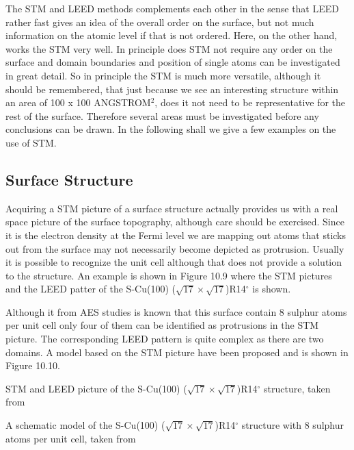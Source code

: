 The STM and LEED methods  complements each other in the sense that LEED rather fast gives an idea of the overall order on the surface, but not much information on the atomic level if that is not ordered. Here, on the other hand,  works the  STM very well. In principle  does STM  not require any order on the surface and domain boundaries and position of single atoms can be investigated in great detail. So in principle the STM is much more versatile, although it should be remembered, that just because we see an interesting structure within an area of 100 x 100 ANGSTROM$^2$, does it not need to be representative for the rest of the surface. Therefore several areas must  be investigated before any conclusions can be drawn. In the following shall we give a few  examples on the use of STM.

\subsection{Surface Structure}
Acquiring a STM picture of a surface structure actually provides us with a real space picture of the surface topography, although care should be exercised. Since  it is the electron density at the Fermi level we are mapping out atoms that sticks out from the surface may  not necessarily become depicted as protrusion. Usually it is possible to recognize the unit cell although that does not provide a solution to the structure. An example is shown in Figure 10.9 where the STM pictures and the LEED patter of the S-Cu(100) ($\sqrt{17} \times \sqrt{17}$)R14$^\circ$ is shown.

 Although it from  AES studies is known that this surface contain 8 sulphur atoms per unit cell only four of them can be identified as protrusions in the STM picture. The corresponding LEED pattern is quite complex as there are two domains. A model based on the STM picture have been proposed and is shown in Figure 10.10. 

\vspace*{9cm}

 STM and LEED picture of the S-Cu(100) ($\sqrt{17} \times \sqrt{17}$)R14$^\circ$ structure, taken from \cite{Luigi}



\vspace*{9cm}

 A schematic model of the S-Cu(100) ($\sqrt{17} \times \sqrt{17}$)R14$^\circ$ structure with 8 sulphur atoms per unit cell, taken from \cite{Luigi}

